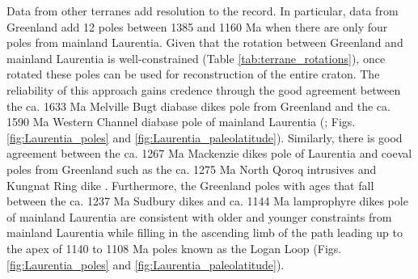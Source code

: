 \documentclass[twocolumn, switch]{article} %
\begin{document}
Data from other terranes add resolution to the record. In particular, data from Greenland add 12 poles between 1385 and 1160 Ma when there are only four poles from mainland Laurentia. Given that the rotation between Greenland and mainland Laurentia is well-constrained (Table \ref{tab:terrane_rotations}), once rotated these poles can be used for reconstruction of the entire craton. The reliability of this approach gains credence through the good agreement between the ca. 1633 Ma Melville Bugt diabase dikes pole from Greenland \citep{Halls2011a} and the ca. 1590 Ma Western Channel diabase pole of mainland Laurentia (\citealp{Irving1972a}; Figs. \ref{fig:Laurentia_poles} and \ref{fig:Laurentia_paleolatitude}). Similarly, there is good agreement between the ca. 1267 Ma Mackenzie dikes pole of Laurentia \citep{Buchan2000a} and coeval poles from Greenland such as the ca. 1275 Ma North Qoroq intrusives \citep{Piper1992a} and Kungnat Ring dike \citep{Piper1977a}. Furthermore, the Greenland poles with ages that fall between the ca. 1237 Ma Sudbury dikes and ca. 1144 Ma lamprophyre dikes pole of mainland Laurentia are consistent with older and younger constraints from mainland Laurentia while filling in the ascending limb of the path leading up to the apex of 1140 to 1108 Ma poles known as the Logan Loop (Figs. \ref{fig:Laurentia_poles} and \ref{fig:Laurentia_paleolatitude}).
\end{document}
